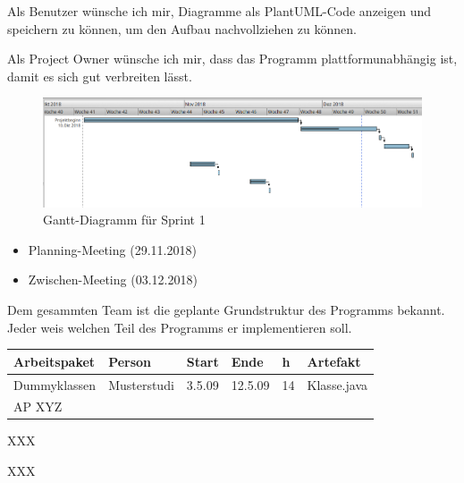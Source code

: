 Als Benutzer wünsche ich mir, Diagramme als PlantUML-Code anzeigen und speichern zu können, um den Aufbau nachvollziehen zu können.
\nsecend

Als Project Owner wünsche ich mir, dass das Programm plattformunabhängig ist, damit es sich gut verbreiten lässt.
\nsecend
\nsecend %

\begin{figure}[hbtp]
\centering
\includegraphics[width=\textwidth]{Bilder/gantt}
\caption{Gantt-Diagramm für Sprint 1}
\end{figure}
\nsecend

\begin{itemize}
\item Planning-Meeting (29.11.2018)
\item Zwischen-Meeting (03.12.2018)
\end{itemize}
\nsecend

Dem gesammten Team ist die geplante Grundstruktur des Programms bekannt. Jeder weis welchen Teil des Programms er implementieren soll.
\nsecend

\begin{longtable}{|p{4cm}|l|l|l|l|l|}
        \hline
        Arbeitspaket & Person & Start & Ende & h & Artefakt\\
        \hline
        Dummyklassen & Musterstudi & 3.5.09 & 12.5.09 & 14 & Klasse.java\\ \hline
        AP XYZ &  &  &  & & \\ \hline
\end{longtable}     
\nsecend

XXX
\nsecend

XXX
\nsecend

